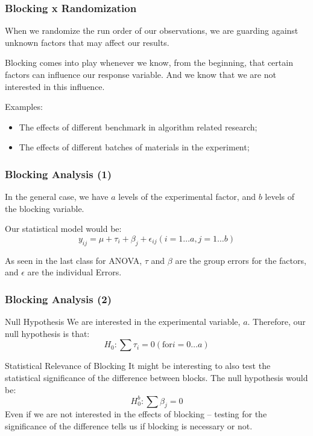 \documentclass[10pt]{beamer}
\begin{document}
\begin{frame}
  \frametitle{Blocking x Randomization} 

  When we randomize the run order of our observations, we are guarding
  against unknown factors that may affect our results.

  Blocking comes into play whenever we know, from the beginning, that
  certain factors can influence our response variable. And we know
  that we are not interested in this influence.

  Examples:
  \begin{itemize}
  \item The effects of different benchmark in algorithm related research;
  \item The effects of different batches of materials in the experiment;
  \end{itemize}

\end{frame}

\begin{frame}
  \frametitle{Blocking Analysis (1)}
  \begin{block}{}
    In the general case, we have $a$ levels of the experimental
    factor, and $b$ levels of the blocking variable.
  \end{block}
  Our statistical model would be:
  \begin{equation*}
    y_{ij} = \mu + \tau_i + \beta_j + \epsilon_{ij} (i = 1\ldots a, j = 1\ldots b)
  \end{equation*}

  As seen in the last class for ANOVA, $\tau$ and $\beta$ are the
  group errors for the factors, and $\epsilon$ are the individual Errors.
\end{frame}

\begin{frame}
  \frametitle{Blocking Analysis (2)}
  \begin{block}{Null Hypothesis}
    We are interested in the experimental variable, $a$. Therefore,
    our null hypothesis is that:
    \begin{equation*}
      H_0: \sum{\tau_i} = 0 (\text{for} i = 0\ldots a)
    \end{equation*}
  \end{block}
  \begin{block}{Statistical Relevance of Blocking}
    It might be interesting to also test the statistical significance
    of the difference between blocks. The null hypothesis would be:
    \begin{equation*}
      H_0^b: \sum{\beta_j} = 0
    \end{equation*}
    Even if we are not interested in the effects of blocking --
    testing for the significance of the difference tells us if
    blocking is necessary or not.
  \end{block}
\end{frame}
\end{document}
